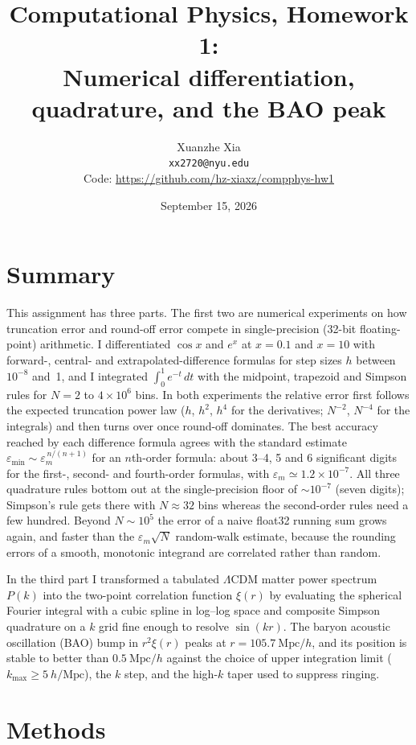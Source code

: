 \documentclass[11pt]{article}
\title{Computational Physics, Homework 1:\\
Numerical differentiation, quadrature, and the BAO peak}
\author{Xuanzhe Xia \\ \texttt{xx2720@nyu.edu} \\[4pt]
\small Code: \url{https://github.com/hz-xiaxz/compphys-hw1}}
\date{September 15, 2026}
\newcommand{\eps}{\varepsilon}
\newcommand{\epsm}{\varepsilon_m}
\begin{document}
\maketitle

\section*{Summary}

This assignment has three parts. The first two are numerical experiments on how
truncation error and round-off error compete in single-precision (32-bit
floating-point) arithmetic. I differentiated $\cos x$ and $e^{x}$ at $x=0.1$ and
$x=10$ with forward-, central- and extrapolated-difference formulas for step sizes
$h$ between $10^{-8}$ and~1, and I integrated $\int_0^1 e^{-t}\,dt$ with the
midpoint, trapezoid and Simpson rules for $N = 2$ to $4\times10^{6}$ bins. In both
experiments the relative error first follows the expected truncation power law
($h$, $h^{2}$, $h^{4}$ for the derivatives; $N^{-2}$, $N^{-4}$ for the integrals)
and then turns over once round-off dominates. The best accuracy reached by each
difference formula agrees with the standard estimate
$\eps_{\min}\sim\epsm^{\,n/(n+1)}$ for an $n$th-order formula: about 3--4, 5 and
6 significant digits for the first-, second- and fourth-order formulas, with
$\epsm\simeq1.2\times10^{-7}$. All three quadrature rules bottom out at the
single-precision floor of $\sim10^{-7}$ (seven digits); Simpson's rule gets there
with $N\approx32$ bins whereas the second-order rules need a few hundred. Beyond
$N\sim10^{5}$ the error of a naive float32 running sum grows again, and faster
than the $\epsm\sqrt{N}$ random-walk estimate, because the rounding errors of a
smooth, monotonic integrand are correlated rather than random.

In the third part I transformed a tabulated $\Lambda$CDM matter power spectrum
$P(k)$ into the two-point correlation function $\xi(r)$ by evaluating the
spherical Fourier integral with a cubic spline in log--log space and composite
Simpson quadrature on a $k$ grid fine enough to resolve $\sin(kr)$. The baryon
acoustic oscillation (BAO) bump in $r^{2}\xi(r)$ peaks at
$r = 105.7\ \mathrm{Mpc}/h$, and its position is stable to better than
$0.5\ \mathrm{Mpc}/h$ against the choice of upper integration limit
($k_{\max}\ge5\ h/\mathrm{Mpc}$), the $k$ step, and the high-$k$ taper used to
suppress ringing.

\section*{Methods}
\end{document}
